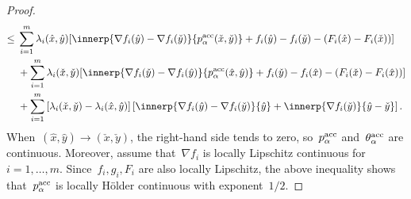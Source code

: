 \documentclass[../main]{subfiles}
\begin{document}
\begin{proof}
\begin{align}
        \le{} & \sum_{i = 1}^{m} \lambda_i(\hat{x}, \hat{y}) [\innerp{\nabla f_i(\hat{y}) - \nabla f_i(\check{y})}{p^\acc_\alpha(\check{x}, \check{y})} + f_i(\hat{y}) - f_i(\check{y}) - (F_i(\hat{x}) - F_i(\check{x}))]                        \\
              & + \sum_{i = 1}^{m} \lambda_i(\check{x}, \check{y}) [\innerp{\nabla f_i(\check{y}) - \nabla f_i(\hat{y})}{p^\acc_\alpha(\hat{x}, \hat{y})} + f_i(\check{y}) - f_i(\hat{x}) - (F_i(\check{x}) - F_i(\hat{x}))]                      \\
              & + \sum_{i = 1}^{m} \left[ \lambda_i(\check{x}, \check{y}) - \lambda_i(\hat{x}, \hat{y}) \right] \left[ \innerp{\nabla f_i(\hat{y}) - \nabla f_i(\check{y})}{\hat{y}} + \innerp{\nabla f_i(\check{y})}{\hat{y} - \check{y}}\right]
        .\end{align}
    When~$(\hat{x}, \hat{y}) \to (\check{x}, \check{y})$, the right-hand side tends to zero, so~$p^{\mathrm{acc}}_\alpha$ and~$\theta^{\mathrm{acc}}_\alpha$ are continuous.
    Moreover, assume that~$\nabla f_i$ is locally Lipschitz continuous for~$i = 1, \dots, m$.
    Since~$f_i, g_i, F_i$ are also locally Lipschitz, the above inequality shows that~$p^{\mathrm{acc}}_\alpha$ is locally H\"older continuous with exponent~$1 / 2$.


\end{proof}
\end{document}
